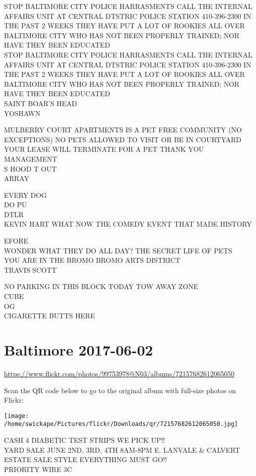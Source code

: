 \documentclass[10pt,letterpaper]{article}
\begin{document}
STOP BALTIMORE CITY POLICE HARRASMENTS CALL THE INTERNAL AFFAIRS UNIT AT CENTRAL DTSTRIC POLICE STATION 410{-}396{-}2300 IN THE PAST 2 WEEKS THEY HAVE PUT A LOT OF ROOKIES ALL OVER BALTIMORE CITY WHO HAS NOT BEEN PROPERLY TRAINED; NOR HAVE THEY BEEN EDUCATED\\
STOP BALTIMORE CITY POLICE HARRASMENTS CALL THE INTERNAL AFFAIRS UNIT AT CENTRAL DTSTRIC POLICE STATION 410{-}396{-}2300 IN THE PAST 2 WEEKS THEY HAVE PUT A LOT OF ROOKIES ALL OVER BALTIMORE CITY WHO HAS NOT BEEN PROPERLY TRAINED; NOR HAVE THEY BEEN EDUCATED\\
SAINT BOAR'S HEAD\\
YOSHAWN

MULBERRY COURT APARTMENTS IS A PET FREE COMMUNITY (NO EXCEPTIONS) NO PETS ALLOWED TO VISIT OR BE IN COURTYARD YOUR LEASE WILL TERMINATE FOR A PET THANK YOU MANAGEMENT\\
S HOOD T OUT\\
ARRAY

EVERY DOG\\
DO PU\\
DTLR\\
KEVIN HART WHAT NOW THE COMEDY EVENT THAT MADE HISTORY

EFORE\\
WONDER WHAT THEY DO ALL DAY?  THE SECRET LIFE OF PETS\\
YOU ARE IN THE BROMO BROMO ARTS DISTRICT\\
TRAVIS SCOTT

NO PARKING IN THIS BLOCK TODAY TOW AWAY ZONE\\
CUBE\\
OG\\
CIGARETTE BUTTS HERE


\section*{Baltimore 2017-06-02}

\url{https://www.flickr.com/photos/99753978@N03/albums/72157682612065050}

Scan the QR code below to go to the original album with full-size photos on Flickr:

\texttt{[image: /home/swickape/Pictures/flickr/Downloads/qr/72157682612065050.jpg]}


CASH 4 DIABETIC TEST STRIPS WE PICK UP!!\\
YARD SALE JUNE 2ND, 3RD, 4TH 8AM{-}8PM E. LANVALE \& CALVERT ESTATE SALE STYLE EVERYTHING MUST GO!!\\
PRIORITY WIRE 3C
\end{document}

